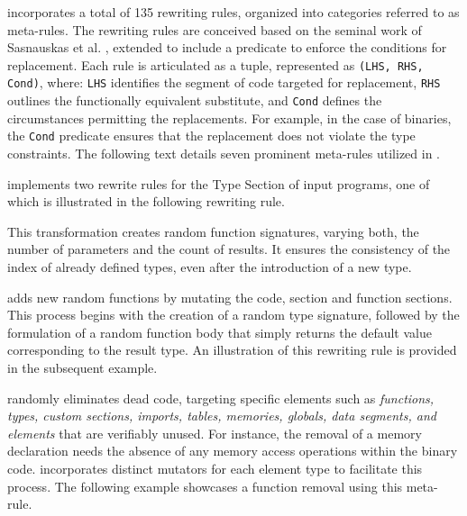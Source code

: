 





\tool incorporates a total of 135 rewriting rules, organized into categories referred to as meta-rules. 
The rewriting rules are conceived based on the seminal work of Sasnauskas et al. \cite{2017arXiv171104422S}, extended to include a predicate to enforce the conditions for replacement. 
Each rule is articulated as a tuple, represented as \texttt{(LHS, RHS, Cond)}, where: \texttt{LHS} identifies the segment of code targeted for replacement, \texttt{RHS} outlines the functionally equivalent substitute, and \texttt{Cond} defines the circumstances permitting the replacements.
For example, in the case of \Wasm binaries, the \texttt{Cond} predicate ensures that the replacement does not violate the type constraints. 
The following text details seven prominent meta-rules utilized in \tool.


\tool implements two rewrite rules for the Type Section of input \Wasm programs, one of which is illustrated in the following rewriting rule. 



This transformation creates random function signatures, varying both, the number of parameters and the count of results. 
It ensures the consistency of the index of already defined types, even after the introduction of a new type.

\tool adds new random functions by mutating the code, section and function sections. 
This process begins with the creation of a random type signature, followed by the formulation of a random function body that simply returns the default value corresponding to the result type. 
An illustration of this rewriting rule is provided in the subsequent example.



 \tool randomly eliminates dead code, targeting specific elements such as \emph{functions, types, custom sections, imports, tables, memories, globals, data segments, and elements} that are verifiably unused. 
For instance, the removal of a memory declaration needs the absence of any memory access operations within the binary code. 
\tool incorporates distinct mutators for each element type to facilitate this process.
The following example showcases a function removal using this meta-rule.



